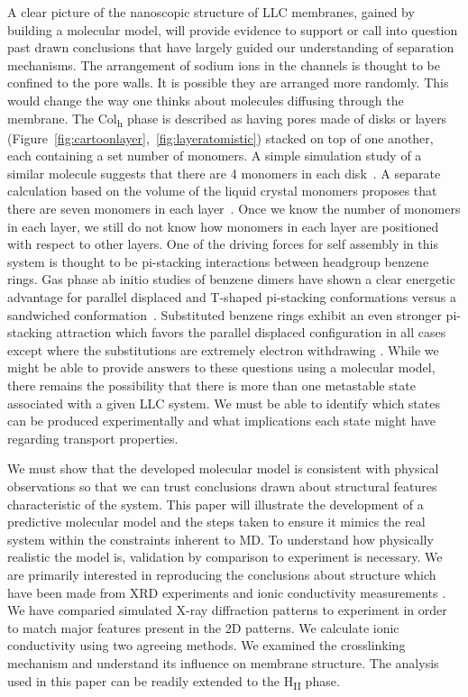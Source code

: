 A clear picture of the nanoscopic structure of LLC membranes, gained by
building a molecular model, will provide evidence to support or call
into question past drawn conclusions that have largely guided our 
understanding of separation mechanisms.	The arrangement of sodium ions
in the channels is thought to be confined to the pore walls. It is 
possible they are arranged more randomly. This would change the way
one thinks about molecules diffusing through the membrane. The
Col\textsubscript{h} phase is described as having pores made of disks or
layers (Figure~\ref{fig:cartoonlayer},~\ref{fig:layeratomistic}) stacked
on top of one another, each containing a set number of monomers. A 
simple simulation study of a similar molecule suggests that there are 4
monomers in each disk~\cite{zhu_methacrylated_2006}. A separate calculation
based on the volume of the liquid crystal monomers proposes that there 
are seven monomers in each layer~\cite{resel_structural_2000}. Once we 
know the number of monomers in each layer, we still do not know how 
monomers in each layer are positioned with respect to other layers. 
One of the driving forces for self %
assembly in this system is thought to be pi-stacking interactions
between headgroup benzene rings\cite{gazit_possible_2002}. Gas phase ab
initio studies of benzene dimers have shown a clear energetic advantage
for parallel displaced and T-shaped pi-stacking conformations versus a
sandwiched conformation~\cite{sinnokrot_estimates_2002}.
Substituted benzene rings exhibit an even stronger pi-stacking 
attraction which favors the parallel displaced configuration in all cases
except where the substitutions are extremely electron withdrawing
\cite{waller_hybrid_2006,ringer_effect_2006}. While we might be able to
provide answers to these questions using a molecular model, there remains
the possibility that there is more than one metastable state associated
with a given LLC system. We must be able to identify which states can
be produced experimentally and what implications each state might have
regarding transport properties.

We must show that the developed molecular model is consistent with
physical observations so that we can trust conclusions drawn about 
structural features characteristic of the system. This paper will
illustrate the development of a predictive molecular model and the steps
taken to ensure it mimics the real system within the constraints 
inherent to MD. To understand how physically realistic the model is,
validation by comparison to experiment is necessary. We are primarily
interested in reproducing the conclusions about structure which have been
made from XRD experiments and ionic conductivity measurements
\cite{feng_thin_2016}. We have comparied simulated X-ray diffraction
patterns to experiment in order to match major features present in the
2D patterns. We calculate ionic conductivity using two agreeing methods.
We examined the crosslinking mechanism and understand its influence on
membrane structure. The analysis used in this paper can be readily
extended to the H\textsubscript{II} phase.

	

